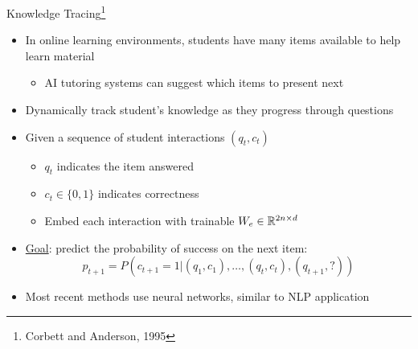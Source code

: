 \documentclass{beamer}
\def \R{\ensuremath \mathbb{R}}
\theoremstyle{definition}
\begin{document}
\begin{frame}{Knowledge Tracing\footnote{Corbett and Anderson, 1995}}
  \begin{itemize}
    \item In online learning environments, students have many items available to help learn material
      \begin{itemize}
        \item AI tutoring systems can suggest which items to present next
      \end{itemize}
    \item Dynamically track student's knowledge as they progress through questions
    \item<2-> Given a sequence of student interactions $(q_t, c_t)$
      \begin{itemize}
        \item $q_t$ indicates the item answered
        \item $c_t \in \{0,1\}$ indicates correctness
        \item Embed each interaction with trainable $W_e \in \R^{2n \times d}$
      \end{itemize}
    \item<3-> \underline{Goal}: predict the probability of success on the next item:
      \[p_{t+1} = P(c_{t+1} = 1 | (q_1, c_1),\ldots, (q_t, c_t), (q_{t+1}, ?))\]
    \item<4-> Most recent methods use neural networks, similar to NLP application
  \end{itemize}
\end{frame}
\end{document}

